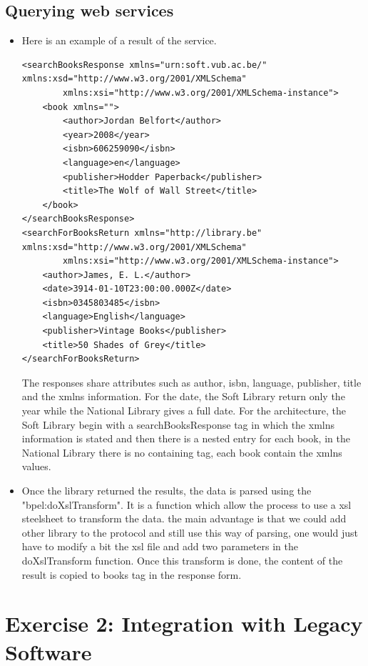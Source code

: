 \documentclass[a4paper,10pt]{article}
\begin{document}
\subsection{Querying web services}
\begin{itemize}
\item Here is an example of a result of the service.
\begin{verbatim}
<searchBooksResponse xmlns="urn:soft.vub.ac.be/" xmlns:xsd="http://www.w3.org/2001/XMLSchema"
        xmlns:xsi="http://www.w3.org/2001/XMLSchema-instance">
    <book xmlns="">
        <author>Jordan Belfort</author>
        <year>2008</year>
        <isbn>606259090</isbn>
        <language>en</language>
        <publisher>Hodder Paperback</publisher>
        <title>The Wolf of Wall Street</title>
    </book>
</searchBooksResponse>
<searchForBooksReturn xmlns="http://library.be" xmlns:xsd="http://www.w3.org/2001/XMLSchema" 
        xmlns:xsi="http://www.w3.org/2001/XMLSchema-instance">
    <author>James, E. L.</author>
    <date>3914-01-10T23:00:00.000Z</date>
    <isbn>0345803485</isbn>
    <language>English</language>
    <publisher>Vintage Books</publisher>
    <title>50 Shades of Grey</title>
</searchForBooksReturn>
\end{verbatim}
The responses share attributes such as author, isbn, language, publisher, title and the xmlns information. For the date, the Soft Library return only the year while the National Library gives a full date. For the architecture, the Soft Library begin with a searchBooksResponse tag in which the xmlns information is stated and then there is a nested entry for each book, in the National Library there is no containing tag, each book contain the xmlns values.\\

\item Once the library returned the results, the data is parsed using the "bpel:doXslTransform". It is a function which allow the process to use a xsl steelsheet to transform the data. the main advantage is that we could add other library to the protocol and still use this way of parsing, one would just have to modify a bit the xsl file and add two parameters in the doXslTransform function. Once this transform is done, the content of the result is copied to books tag in the response form.
\end{itemize}
\section{Exercise 2: Integration with Legacy Software}
\end{document}
